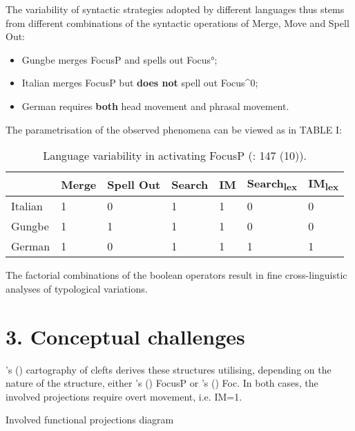 \documentclass[fleqn,10pt]{wlscirep}
\begin{document}
\noindent The variability of syntactic strategies adopted by different languages thus stems from different combinations of the syntactic operations of Merge, Move and Spell Out: 

\begin{itemize}
\item Gungbe merges FocusP and spells out Focus°; 
\item \vspace*{-2mm} Italian merges FocusP but \textbf{does not} spell out Focus^0; 
\item \vspace*{-2mm} German requires \textbf{both} head movement and phrasal movement. 
\end{itemize}

\noindent The parametrisation of the observed phenomena can be viewed as in TABLE I:

\begin{table}[H]
    \centering
    \begin{tabular}{|l|l|l|l|l|l|l|}
    \hline
     & Merge & Spell Out & Search & IM & Search\textsubscript{lex} & IM\textsubscript{lex} \\
    \hline
    Italian & 1 & 0 & 1 & 1 & 0 & 0 \\
    \hline
    Gungbe & 1 & 1 & 1 & 1 & 0 & 0 \\
    \hline
    German & 1 & 0 & 1 & 1 & 1 & 1 \\
    \hline
    \end{tabular}
    \caption{\label{tab:samp}Language variability in activating FocusP (\citealt{samo2019cartography}: 147 (10)).}
    \end{table}

\noindent The factorial combinations of the boolean operators result in fine cross-linguistic analyses of typological variations.


\section*{3. Conceptual challenges}

\citeauthor{belletti2015}’s (\citeyear{belletti2015}) cartography of clefts derives these structures utilising, depending on the nature of the structure, either \citeauthor{rizzi1997fine}’s (\citeyear{rizzi1997fine}) FocusP or \citeauthor{belletti2004}’s (\citeyear{belletti2004}) Foc. 
In both cases, the involved projections require overt movement, i.e. IM=1.

\begin{exe}
    \ex Involved functional projections diagram
\end{exe}
\end{document}
